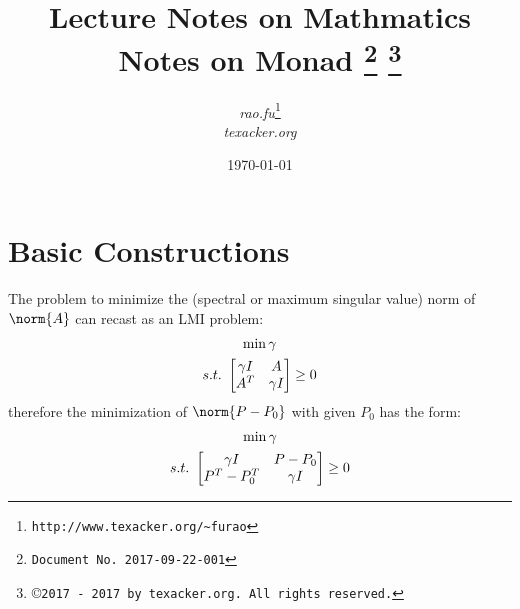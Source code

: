 \documentclass{article}
\begin{document}


\title{\textbf{Lecture Notes on Mathmatics} \\[1em] Notes on Monad
{\footnote{\texttt{Document No. 2017-09-22-001}}}
{\footnote{\copyright \texttt{2017 - 2017 by texacker.org. All rights reserved.}}}
}

\author{%
\small{\textit{rao.fu}}\thanks{\texttt{http://www.texacker.org/\~{}furao}} \\ \small{\textit{texacker.org}}
}
\date{\today}

\maketitle

\section{Basic Constructions}
The problem to minimize the (spectral or maximum singular value) norm of $\norm{A}$
can recast as an LMI problem:
\begin{gather}
\min \gamma \\
s.t.\,\,
\begin{bmatrix}
\gamma I & A \\
A^T      & \gamma I
\end{bmatrix}
\ge 0 \notag
\end{gather}
therefore the minimization of $\norm{P - P_0}$ with given $P_0$
has the form:
\begin{gather}
\min \gamma \\
s.t.\,\,
\begin{bmatrix}
\gamma I    & P - P_0 \\
P^T - P_0^T & \gamma I
\end{bmatrix}
\ge 0 \notag
\end{gather}
\end{document}
